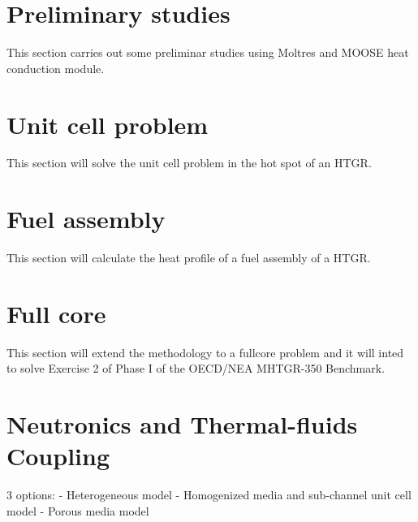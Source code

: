 \section{Preliminary studies}

This section carries out some preliminar studies using Moltres and MOOSE heat conduction module.

\section{Unit cell problem}

This section will solve the unit cell problem in the hot spot of an HTGR.

\section{Fuel assembly}

This section will calculate the heat profile of a fuel assembly of a HTGR.

\section{Full core}

This section will extend the methodology to a fullcore problem and it will inted to solve Exercise 2 of Phase I of the OECD/NEA MHTGR-350 Benchmark.




\section{Neutronics and Thermal-fluids Coupling}

3 options:
- Heterogeneous model
- Homogenized media and sub-channel unit cell model
- Porous media model

